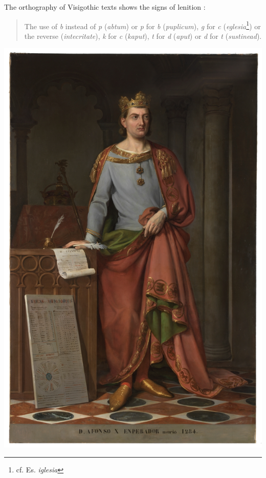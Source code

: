 \documentclass{report}[12pt]
\begin{document}
The orthography of Visigothic texts shows the signs of lenition \cite[p.~159]{latin_paleography}:
\begin{quote}
  The use of \emph{b} instead of \emph{p} (\emph{abtum}) or \emph{p} for \emph{b} (\emph{puplicum}), \emph{g} for \emph{c} (\emph{eglesia}\footnote{cf. Es. \emph{iglesia}}) or the reverse (\emph{intecritate}), \emph{k} for \emph{c} (\emph{kaput}), \emph{t} for \emph{d} (\emph{aput}) or \emph{d} for \emph{t} (\emph{sustinead}).
\end{quote}

\pagebreak

\includegraphics[scale=0.45]{alfonso_x.jpg}

\thispagestyle{empty}
\end{document}
